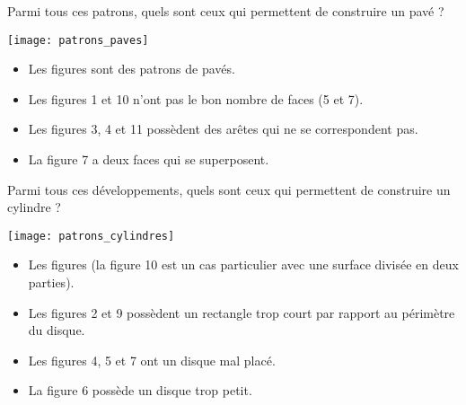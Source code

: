 \begin{Maquette}[Fiche,CorrigeFin,Colonnes=2]{}
   
   \begin{exercice}[SLF] %
      Parmi tous ces patrons, quels sont ceux qui permettent de construire un pavé ?
      \begin{center}
         \texttt{[image: patrons\_paves]}
      \end{center}
   \end{exercice}
   
   \begin{Solution}
      \begin{itemize}
         \item Les figures  sont des patrons de pavés.
         \item Les figures 1 et 10 n'ont pas le bon nombre de faces (5 et 7).
         \item Les figures 3, 4 et 11 possèdent des arêtes qui ne se correspondent pas.
         \item La figure 7 a deux faces qui se superposent.
      \end{itemize}
   \end{Solution}
   
   \begin{exercice}[SLF] %
      Parmi tous ces développements, quels sont ceux qui permettent de construire un cylindre ? \smallskip
      \begin{center}
         \texttt{[image: patrons\_cylindres]}
      \end{center}
   \end{exercice}
   
   \begin{Solution}
      \begin{itemize}
         \item Les figures  (la figure 10 est un cas particulier avec une surface divisée en deux parties).
         \item Les figures 2 et 9 possèdent un rectangle trop court par rapport au périmètre du disque.
         \item Les figures 4, 5 et 7 ont un disque mal placé.
         \item La figure 6 possède un disque trop petit.
      \end{itemize}
   \end{Solution}

\end{Maquette}



